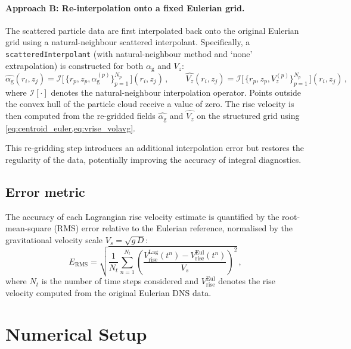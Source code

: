 \documentclass[11pt,a4paper]{article}
\newcommand{\alphag}{\alpha_{\mathrm{g}}}
\newcommand{\Vz}{V_z}
\newcommand{\ERMS}{E_{\mathrm{RMS}}}
\begin{document}
\paragraph{Approach B: Re-interpolation onto a fixed Eulerian grid.}
The scattered particle data are first interpolated back onto the original
Eulerian grid using a natural-neighbour scattered interpolant.  Specifically,
a \texttt{scatteredInterpolant} (with natural-neighbour method and `none'
extrapolation) is constructed for both $\alphag$ and $\Vz$:
\begin{equation}\label{eq:reinterp}
  \hat{\alphag}(r_i,z_j) = \mathcal{I}\bigl[\,
    \{r_p, z_p, \alphag^{(p)}\}_{p=1}^{N_p}\,\bigr](r_i,z_j)\,,
  \qquad
  \hat{\Vz}(r_i,z_j) = \mathcal{I}\bigl[\,
    \{r_p, z_p, \Vz^{(p)}\}_{p=1}^{N_p}\,\bigr](r_i,z_j)\,,
\end{equation}
where $\mathcal{I}[\cdot]$ denotes the natural-neighbour interpolation
operator.  Points outside the convex hull of the particle cloud receive a
value of zero.  The rise velocity is then computed from the re-gridded
fields $\hat{\alphag}$ and $\hat{\Vz}$ on the structured grid using
\cref{eq:centroid_euler,eq:vrise_volavg}.

This re-gridding step introduces an additional interpolation error but
restores the regularity of the data, potentially improving the accuracy of
integral diagnostics.


\subsection{Error metric}
\label{sec:error_metric}

The accuracy of each Lagrangian rise velocity estimate is quantified by the
root-mean-square (RMS) error relative to the Eulerian reference, normalised
by the gravitational velocity scale $V_s = \sqrt{g\,D}$:
\begin{equation}\label{eq:rms}
  \ERMS = \sqrt{\frac{1}{N_t}\sum_{n=1}^{N_t}
    \left(\frac{V_{\mathrm{rise}}^{\mathrm{Lag}}(t^n)
      - V_{\mathrm{rise}}^{\mathrm{Eul}}(t^n)}
      {V_s}\right)^{\!2}}\,,
\end{equation}
where $N_t$ is the number of time steps considered and
$V_{\mathrm{rise}}^{\mathrm{Eul}}$ denotes the rise velocity computed from
the original Eulerian DNS data.


\section{Numerical Setup}\label{sec:setup}
\end{document}
